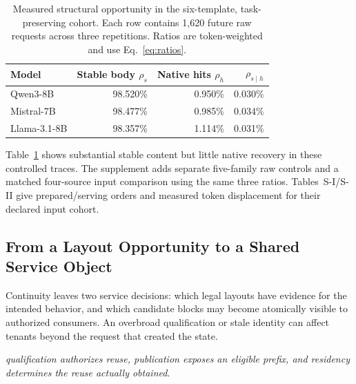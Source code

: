 \begin{table}[t]
\centering\small
\caption{Measured structural opportunity in the six-template, task-preserving cohort. Each row contains 1,620 future raw requests across three repetitions. Ratios are token-weighted and use Eq.~\eqref{eq:ratios}.}
\label{tab:motivation}
\begin{tabular}{@{}lrrr@{}}
\toprule
Model & Stable body $\rho_s$ & Native hits $\rho_h$ & $\rho_{s\mid h}$\\
\midrule
Qwen3-8B & 98.520\% & 0.950\% & 0.030\%\\
Mistral-7B & 98.477\% & 0.985\% & 0.034\%\\
Llama-3.1-8B & 98.357\% & 1.114\% & 0.031\%\\
\bottomrule
\end{tabular}
\end{table}

Table~\ref{tab:motivation} shows substantial stable content but little native recovery in these controlled traces. The supplement adds separate five-family raw controls and a matched four-source input comparison using the same three ratios. Tables~S-I/S-II give prepared/serving orders and measured token displacement for their declared input cohort.

\subsection{From a Layout Opportunity to a Shared Service Object}
Continuity leaves two service decisions: which legal layouts have evidence for the intended behavior, and which candidate blocks may become atomically visible to authorized consumers. An overbroad qualification or stale identity can affect tenants beyond the request that created the state.

\emph{qualification authorizes reuse, publication exposes an eligible prefix, and residency determines the reuse actually obtained}.
